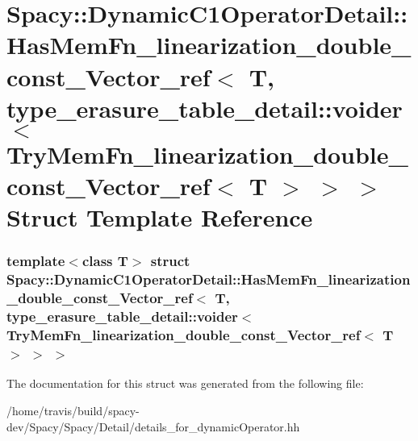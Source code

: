 \hypertarget{structSpacy_1_1DynamicC1OperatorDetail_1_1HasMemFn__linearization__double__const__Vector__ref_3_828908b7d18264122b966781a4125447}{\section{\-Spacy\-:\-:\-Dynamic\-C1\-Operator\-Detail\-:\-:\-Has\-Mem\-Fn\-\_\-linearization\-\_\-double\-\_\-const\-\_\-\-Vector\-\_\-ref$<$ \-T, type\-\_\-erasure\-\_\-table\-\_\-detail\-:\-:voider$<$ \-Try\-Mem\-Fn\-\_\-linearization\-\_\-double\-\_\-const\-\_\-\-Vector\-\_\-ref$<$ \-T $>$ $>$ $>$ \-Struct \-Template \-Reference}
\label{structSpacy_1_1DynamicC1OperatorDetail_1_1HasMemFn__linearization__double__const__Vector__ref_3_828908b7d18264122b966781a4125447}
}
\subsubsection*{template$<$class T$>$ struct Spacy\-::\-Dynamic\-C1\-Operator\-Detail\-::\-Has\-Mem\-Fn\-\_\-linearization\-\_\-double\-\_\-const\-\_\-\-Vector\-\_\-ref$<$ T, type\-\_\-erasure\-\_\-table\-\_\-detail\-::voider$<$ Try\-Mem\-Fn\-\_\-linearization\-\_\-double\-\_\-const\-\_\-\-Vector\-\_\-ref$<$ T $>$ $>$ $>$}



\-The documentation for this struct was generated from the following file\-:\begin{DoxyCompactItemize}
\item 
/home/travis/build/spacy-\/dev/\-Spacy/\-Spacy/\-Detail/details\-\_\-for\-\_\-dynamic\-Operator.\-hh\end{DoxyCompactItemize}
